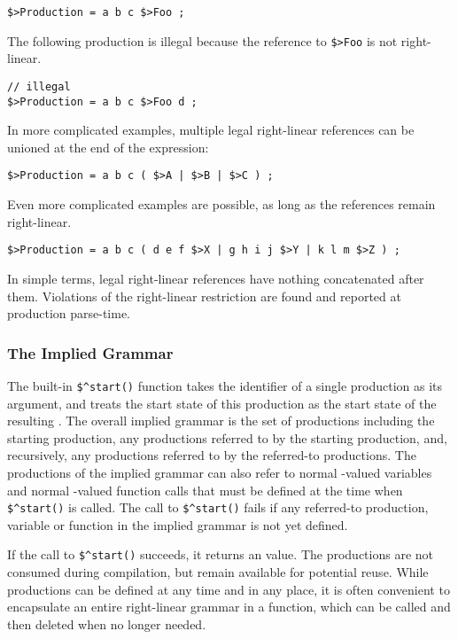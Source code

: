 \begin{Verbatim}
$>Production = a b c $>Foo ;
\end{Verbatim}

\noindent
The following production is illegal because the reference to \verb!$>Foo! is not right-linear.

\begin{Verbatim}
// illegal
$>Production = a b c $>Foo d ;
\end{Verbatim}


\noindent
In more complicated examples, multiple legal right-linear references can be unioned 
at the end of the expression:

\begin{Verbatim}
$>Production = a b c ( $>A | $>B | $>C ) ;
\end{Verbatim}

\noindent
Even more complicated examples are possible, as long as the references remain
right-linear. 

\begin{Verbatim}
$>Production = a b c ( d e f $>X | g h i j $>Y | k l m $>Z ) ;
\end{Verbatim}

\noindent
In simple terms, legal right-linear references have nothing concatenated
after them.
Violations of the right-linear restriction are found and reported
at production parse-time.

\subsubsection{The Implied Grammar}

The built-in \verb!$^start()! function takes the identifier of a single
production as its argument, and treats the start state of this production as the
start state of the resulting \fsm{}.  The overall implied grammar is the set
of productions including the
starting production, any productions referred to by the starting
production, and, 
recursively, any productions referred to by the referred-to productions.
The productions of the implied grammar
can also refer to normal \fsm{}-valued variables and
normal \fsm{}-valued function calls that must be defined at the time when
\verb!$^start()! is called.
The call to \verb!$^start()! fails if any referred-to production, variable
or function in the
implied grammar is
not yet defined.

If the call to \verb!$^start()! succeeds, it returns an \fsm{} value.  The
productions are not consumed during compilation, but remain available for
potential reuse.  While productions can be defined at any time and in any
place, it is often convenient to encapsulate an entire right-linear grammar
in a function, which can be called and then deleted when no longer
needed.

